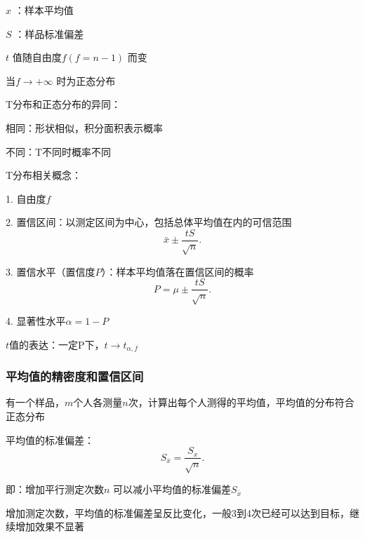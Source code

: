 $x$ ：样本平均值

$S$ ：样品标准偏差

$t$ 值随自由度$f\left( f=n-1 \right) $ 而变

当$f\to +\infty$ 时为正态分布
\begin{notation}
    T分布和正态分布的异同：

    相同：形状相似，积分面积表示概率

    不同：T不同时概率不同
\end{notation}
\begin{notation}
    T分布相关概念：

    1. 自由度$f$ 

    2. 置信区间：以测定区间为中心，包括总体平均值在内的可信范围\[
        \bar{x}\pm \frac{tS}{\sqrt{n} }
    .\]

    3. 置信水平（置信度$P$）：样本平均值落在置信区间的概率\[
        P = \mu\pm \frac{tS}{\sqrt{n} }
    .\]

    4. 显著性水平$\alpha=1-P$
\end{notation}
$t$值的表达：一定P下，$t\to t_{\alpha,f}$ 
\subsubsection{平均值的精密度和置信区间}%
\label{subsub:平均值的精密度和置信区间}
\begin{eg}
    有一个样品，$m$个人各测量$n$次，计算出每个人测得的平均值，平均值的分布符合正态分布
\end{eg}
平均值的标准偏差：
\[
    S_{\bar{x}}=\frac{S_{x}}{\sqrt{n} }
.\] 

即：增加平行测定次数$n$ 可以减小平均值的标准偏差$S_{\bar{x}}$ 
\begin{notation}
    增加测定次数，平均值的标准偏差呈反比变化，一般3到4次已经可以达到目标，继续增加效果不显著
\end{notation}
